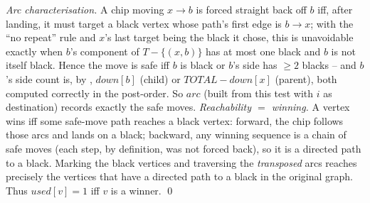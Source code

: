 \begin{proofbox}
\emph{Arc characterisation.} A chip moving $x\!\to\!b$ is forced straight back off
$b$ iff, after landing, it must target a black vertex whose path's first edge is
$b\!\to\!x$; with the ``no repeat'' rule and $x$'s last target being the black it
chose, this is unavoidable exactly when $b$'s component of $T-\{(x,b)\}$ has at
most one black and $b$ is not itself black. Hence the move is safe iff $b$ is black
or $b$'s side has $\ge 2$ blacks -- and $b$'s side count is, by
, $\mathit{down}[b]$ (child) or $\mathit{TOTAL}-\mathit{down}
[x]$ (parent), both computed correctly in the post-order. So $\mathit{arc}$ (built
from this test with $i$ as destination) records exactly the safe moves.
\emph{Reachability $=$ winning.} A vertex wins iff some safe-move path reaches a
black vertex: forward, the chip follows those arcs and lands on a black; backward,
any winning sequence is a chain of safe moves (each step, by definition, was not
forced back), so it is a directed path to a black. Marking the black vertices and
traversing the \emph{transposed} arcs reaches precisely the vertices that have a
directed path to a black in the original graph. Thus $\mathit{used}[v]=1$ iff $v$
is a winner. \qed
\end{proofbox}

